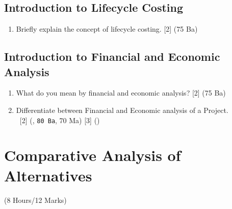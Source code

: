 \documentclass[12pt]{article}
\newcommand{\enter}{\\\textcolor{white}{1}}
\begin{document}
	\subsection{Introduction to Lifecycle Costing}
	\begin{enumerate}[noitemsep, topsep = 0pt]
		\item Briefly explain the concept of lifecycle costing. \hfill [2] (75 Ba)
	\end{enumerate}

	\subsection{Introduction to Financial and Economic Analysis}
	\begin{enumerate}[noitemsep, topsep = 0pt]
		\item What do you mean by financial and economic analysis? \hfill [2] (75 Ba)

		\item Differentiate between Financial and Economic analysis of a Project.
		\enter\hfill [2] (, \texttt{80 Ba}, 70 Ma) [3] ()
	\end{enumerate}

	\pagebreak
\section{Comparative Analysis of Alternatives}
	\begin{center}(8 Hours/12 Marks)\end{center}
\end{document}
